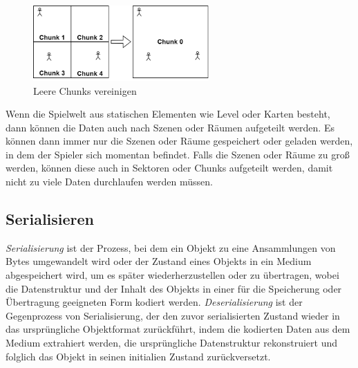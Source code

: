 \begin{figure}[htp]
    \centering
    \includegraphics[width=0.6\textwidth]{images/chunkJoining.png}
    \caption{Leere Chunks vereinigen}
    \label{fig:chunkJoining}
\end{figure}

Wenn die Spielwelt aus statischen Elementen wie Level oder Karten besteht, dann können die Daten auch nach Szenen oder Räumen aufgeteilt werden. Es können dann immer nur die Szenen oder Räume gespeichert oder geladen werden, in dem der Spieler sich momentan befindet. Falls die Szenen oder Räume zu groß werden, können diese auch in Sektoren oder Chunks aufgeteilt werden, damit nicht zu viele Daten durchlaufen werden müssen.    


\subsection{Serialisieren}

\textit{Serialisierung} ist der Prozess, bei dem ein Objekt zu eine Ansammlungen von Bytes umgewandelt wird oder der Zustand eines Objekts in ein Medium abgespeichert wird, um es später wiederherzustellen oder zu übertragen, wobei die Datenstruktur und der Inhalt des Objekts in einer für die Speicherung oder Übertragung geeigneten Form kodiert werden. \textit{Deserialisierung} ist der Gegenprozess von Serialisierung, der den zuvor serialisierten Zustand wieder in das ursprüngliche Objektformat zurückführt, indem die kodierten Daten aus dem Medium extrahiert werden, die ursprüngliche Datenstruktur rekonstruiert und folglich das Objekt in seinen initialien Zustand zurückversetzt.\cite{codeguruWorkingWith}

